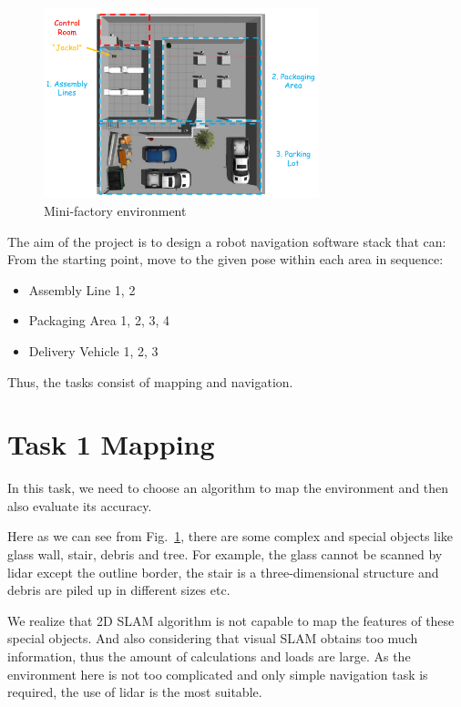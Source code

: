 \documentclass[hyperref]{article}
\theoremstyle{nonumberplain}
\begin{document}
\begin{figure}[H]
	\centering
	\includegraphics[width=8cm]{map_given.png}
	\caption{Mini-factory environment}
	\label{fig1}
\end{figure}

The aim of the project is to design a robot navigation software stack that can: From the starting point, move to the given pose within each area in sequence:

\begin{itemize}[itemsep=3pt,topsep=0pt,parsep=0pt]
	\item Assembly Line 1, 2
	\item Packaging Area 1, 2, 3, 4
	\item Delivery Vehicle 1, 2, 3
\end{itemize}

Thus, the tasks consist of mapping and navigation.

\section{Task 1 Mapping}
\hspace{1.0em}
In this task, we need to choose an algorithm to map the environment and then also evaluate its accuracy. 

Here as we can see from Fig.~\ref{fig1}, there are some complex and special objects like glass wall, stair, debris and tree. For example, the glass cannot be scanned by lidar except the outline border, the stair is a three-dimensional structure and debris are piled up in different sizes etc. 

We realize that 2D SLAM algorithm is not capable to map the features of these special objects. And also considering that visual SLAM obtains too much information, thus the amount of calculations and loads are large. As the environment here is not too complicated and only simple navigation task is required, the use of lidar is the most suitable. 
\end{document}
